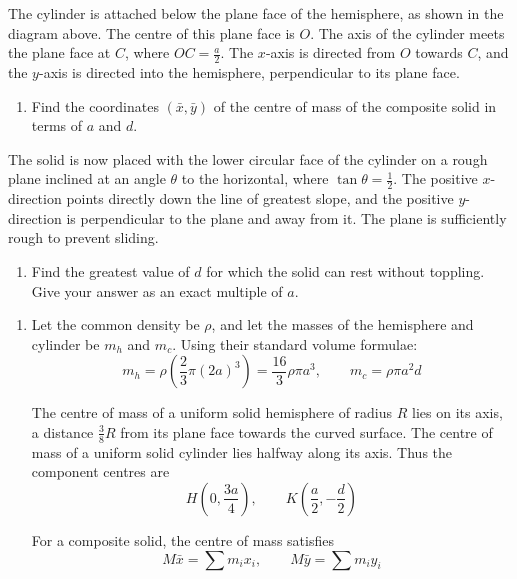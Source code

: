 \documentclass[leqno]{article}
\begin{document}
\begin{enumerate}[
  label=\textbf{\arabic*.},
  leftmargin=*,
  topsep=0pt,
  partopsep=0pt,
  parsep=0pt
]
The cylinder is attached below the plane face of the hemisphere, as shown in the diagram above. The centre of this plane face is $O$. The axis of the cylinder meets the plane face at $C$, where $OC=\frac{a}{2}$. The $x$-axis is directed from $O$ towards $C$, and the $y$-axis is directed into the hemisphere, perpendicular to its plane face. \\
\begin{enumerate}[label=\textbf{(\alph*)}]
\item Find the coordinates $(\bar{x},\bar{y})$ of the centre of mass of the composite solid in terms of $a$ and $d$.  \\
\end{enumerate}
The solid is now placed with the lower circular face of the cylinder on a rough plane inclined at an angle $\theta$ to the horizontal, where $\tan\theta=\frac{1}{2}$. The positive $x$-direction points directly down the line of greatest slope, and the positive $y$-direction is perpendicular to the plane and away from it. The plane is sufficiently rough to prevent sliding. \\
\begin{enumerate}[label=\textbf{(\alph*)}, resume]
\item Find the greatest value of $d$ for which the solid can rest without toppling. Give your answer as an exact multiple of $a$.  \\
\end{enumerate}

\vspace*{10pt}

\begin{djsSolution}
\begin{enumerate}[label=\textbf{(\alph*)}, start=1]
\item
Let the common density be \(\rho\), and let the masses of the hemisphere and cylinder be \(m_h\) and \(m_c\). Using their standard volume formulae:
\[
m_h=\rho\left(\frac23\pi(2a)^3\right)=\frac{16}{3}\rho\pi a^3,
\qquad
m_c=\rho\pi a^2d
\]

The centre of mass of a uniform solid hemisphere of radius \(R\) lies on its axis, a distance \(\frac38 R\) from its plane face towards the curved surface.
The centre of mass of a uniform solid cylinder lies halfway along its axis.
Thus the component centres are
\[
H\left(0,\frac{3a}{4}\right),
\qquad
K\left(\frac a2,-\frac d2\right)
\]

For a composite solid, the centre of mass satisfies
\[
M\bar{x}=\sum m_ix_i,
\qquad
M\bar{y}=\sum m_iy_i
\]


\end{enumerate}
\end{djsSolution}
\end{enumerate}
\end{document}
